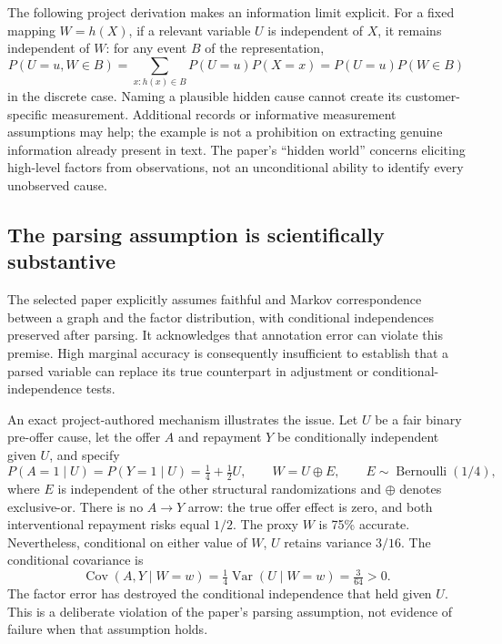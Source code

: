 The following project derivation makes an information limit explicit.
For a fixed mapping $W=h(X)$, if a
relevant variable $U$ is independent of $X$, it remains independent of $W$:
for any event $B$ of the representation,
\begin{equation}
 P(U=u,W\in B)
 =\sum_{x:h(x)\in B}P(U=u)P(X=x)
 =P(U=u)P(W\in B)
 \label{exec19:coat-information}
\end{equation}
in the discrete case. Naming a plausible hidden cause cannot create its
customer-specific measurement. Additional records or informative measurement
assumptions may help; the example is not a prohibition on extracting genuine
information already present in text. The paper's ``hidden world'' concerns
eliciting high-level factors from observations, not an unconditional ability
to identify every unobserved cause.~\citep{exec19_coat}

\subsection{The parsing assumption is scientifically substantive}
\label{exec19:coat-parsing}
The selected paper explicitly assumes faithful and Markov correspondence
between a graph and the factor distribution, with conditional independences
preserved after parsing. It acknowledges that annotation error can violate
this premise. High marginal accuracy is consequently insufficient to establish
that a parsed variable can replace its true counterpart in adjustment or
conditional-independence tests.~\citep{exec19_coat}

An exact project-authored mechanism illustrates the issue. Let $U$ be a fair
binary pre-offer cause, let the offer $A$ and repayment $Y$ be conditionally
independent given $U$, and specify
\begin{equation}
 P(A=1\mid U)=P(Y=1\mid U)=\tfrac14+\tfrac12U,
 \qquad W=U\mathbin{\oplus}E,
 \qquad E\sim\operatorname{Bernoulli}(1/4),
 \label{exec19:coat-noise-law}
\end{equation}
where $E$ is independent of the other structural randomizations and $\oplus$
denotes exclusive-or. There is no $A\to Y$ arrow: the true offer effect is
zero, and both interventional repayment risks equal $1/2$. The proxy $W$ is
75\% accurate. Nevertheless, conditional on either value of $W$, $U$ retains
variance $3/16$. The conditional covariance is
\begin{equation}
 \operatorname{Cov}(A,Y\mid W=w)
 =\tfrac14\operatorname{Var}(U\mid W=w)=\tfrac3{64}>0.
 \label{exec19:coat-covariance}
\end{equation}
The factor error has destroyed the conditional independence that held given
$U$. This is a deliberate violation of the paper's parsing assumption, not
evidence of failure when that assumption holds.~\citep{exec19_coat_reference}

